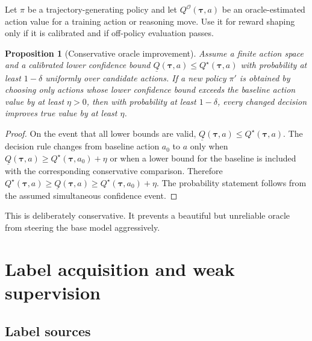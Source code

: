 \documentclass[11pt]{article}
\newtheorem{proposition}[theorem]{Proposition}
\theoremstyle{definition}
\theoremstyle{remark}
\newcommand{\traj}{\boldsymbol{\tau}}
\numberwithin{equation}{section}
\begin{document}
Let \(\pi\) be a trajectory-generating policy and let \(Q^{\mathcal O}(\traj,a)\) be an oracle-estimated action value for a training action or reasoning move.  Use it for reward shaping only if it is calibrated and if off-policy evaluation passes.

\begin{proposition}[Conservative oracle improvement]
Assume a finite action space and a calibrated lower confidence bound \(\underline Q(\traj,a)\le Q^\star(\traj,a)\) with probability at least \(1-\delta\) uniformly over candidate actions.  If a new policy \(\pi'\) is obtained by choosing only actions whose lower confidence bound exceeds the baseline action value by at least \(\eta>0\), then with probability at least \(1-\delta\), every changed decision improves true value by at least \(\eta\).
\end{proposition}
\begin{proof}
On the event that all lower bounds are valid, \(\underline Q(\traj,a)\le Q^\star(\traj,a)\).  The decision rule changes from baseline action \(a_0\) to \(a\) only when \(\underline Q(\traj,a)\ge Q^\star(\traj,a_0)+\eta\) or when a lower bound for the baseline is included with the corresponding conservative comparison.  Therefore \(Q^\star(\traj,a)\ge \underline Q(\traj,a)\ge Q^\star(\traj,a_0)+\eta\).  The probability statement follows from the assumed simultaneous confidence event.
\end{proof}

This is deliberately conservative.  It prevents a beautiful but unreliable oracle from steering the base model aggressively.

\section{Label acquisition and weak supervision}

\subsection{Label sources}
\end{document}

